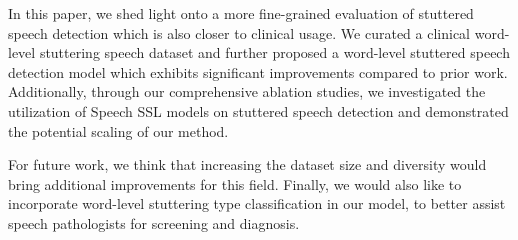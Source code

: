 In this paper, we shed light onto a more fine-grained evaluation of stuttered speech detection which is also closer to clinical usage.
We curated a clinical word-level stuttering speech dataset and further proposed a word-level stuttered speech detection model which exhibits significant improvements compared to prior work.
Additionally, through our comprehensive ablation studies, we investigated the utilization of Speech SSL models on stuttered speech detection and demonstrated the potential scaling of our method.

For future work, we think that increasing the dataset size and diversity would bring additional improvements for this field.
Finally, we would also like to incorporate word-level stuttering type classification in our model, to better assist speech pathologists for screening and diagnosis. 